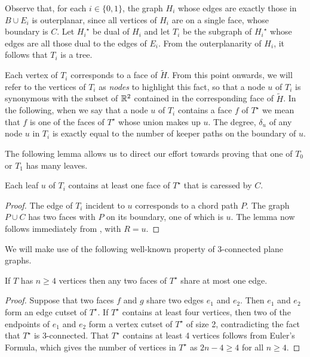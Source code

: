\documentclass{patmorin}
\newcommand{\dual}[1]{{#1}^\star}
\begin{document}
Observe that, for each $i\in\{0,1\}$, the graph $H_i$ whose edges are
exactly those in $B\cup E_i$ is outerplanar, since all vertices of $H_i$
are on a single face, whose boundary is $C$.  Let $\dual{H_i}$ be dual
of $H_i$ and let $T_i$ be the subgraph of $\dual{H_i}$ whose edges are
all those dual to the edges of $E_i$. From the outerplanarity of $H_i$,
it follows that $T_i$ is a tree.  

Each vertex of $T_i$ corresponds to a face of $\tilde{H}$.  From this
point onwards, we will refer to the vertices of $T_i$ as \emph{nodes}
to highlight this fact, so that a node $u$ of $T_i$ is synonymous with
the subset of $\mathbb{R}^2$ contained in the corresponding face of $\tilde{H}$.
In the following, when we say that a node $u$ of $T_i$ contains a face $f$
of $\dual{T}$ we mean that $f$ is one of the faces of $\dual{T}$ whose
union makes up $u$.  The degree, $\delta_u$ of any node $u$ in $T_i$
is exactly equal to the number of keeper paths on the boundary of $u$.

The following lemma allows us to direct our effort towards proving that
one of $T_0$ or $T_1$ has many leaves.

\begin{lem}
   Each leaf $u$ of $T_i$ contains at least one face of $\dual{T}$
   that is caressed by $C$.
\end{lem}

\begin{proof}
   The edge of $T_i$ incident to $u$ corresponds to a chord path $P$. The
   graph $P\cup C$ has two faces with $P$ on its boundary, one of which
   is $u$.  The lemma now follows immediately from ,
   with $R=u$.
\end{proof}

We will make use of the following well-known property of
3-connected plane graphs.

\begin{lem}
   If $T$ has $n\ge 4$ vertices then any two faces of $\dual{T}$ share at 
   most one edge.
\end{lem}

\begin{proof}
   Suppose that two faces $f$ and $g$ share two edges $e_1$ and
   $e_2$. Then $e_1$ and $e_2$ form an edge cutset of $\dual{T}$.
   If $\dual{T}$ contains at least four vertices, then two of the
   endpoints of $e_1$ and $e_2$ form a vertex cutset of $\dual{T}$
   of size 2, contradicting the fact that $\dual{T}$ is 3-connected.
   That $\dual{T}$ contains at least 4 vertices follows from Euler's
   Formula, which gives the number of vertices in $\dual{T}$ as $2n-4\ge
   4$ for all $n\ge 4$.
\end{proof}
\end{document}
